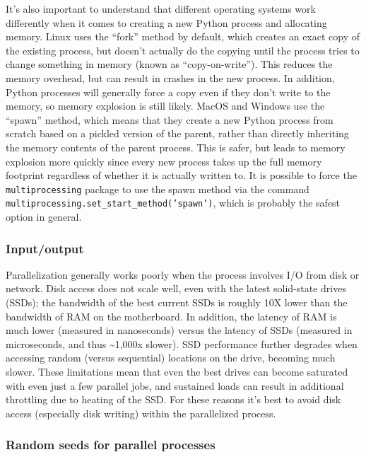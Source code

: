 It's also important to understand that different operating systems work differently when it comes to creating a new Python process and allocating memory.  Linux uses the ``fork'' method by default, which creates an exact copy of the existing process, but doesn't actually do the copying until the process tries to change something in memory (known as ``copy-on-write'').  This reduces the memory overhead, but can result in crashes in the new process. In addition, Python processes will generally force a copy even if they don't write to the memory, so memory explosion is still likely.  MacOS and Windows use the ``spawn'' method, which means that they create a new Python process from scratch based on a pickled version of the parent, rather than directly inheriting the memory contents of the parent process.  This is safer, but leads to memory explosion more quickly since every new process takes up the full memory footprint regardless of whether it is actually written to.  It is possible to force the \texttt{multiprocessing} package to use the spawn method via the command \texttt{multiprocessing.set\_start\_method('spawn')}, which is probably the safest option in general.

\subsubsection{Input/output}

Parallelization generally works poorly when the process involves I/O from disk or network.  Disk access does not scale well, even with the latest solid-state drives (SSDs); the bandwidth of the best current SSDs is roughly 10X lower than the bandwidth of RAM on the motherboard.  In addition, the latency of RAM is much lower (measured in nanoseconds) versus the latency of SSDs (measured in microseconds, and thus {\textasciitilde}1,000x slower).  SSD performance further degrades when accessing random (versus sequential) locations on the drive, becoming much slower.  These limitations mean that even the best drives can become saturated with even just a few parallel jobs, and sustained loads can result in additional throttling due to heating of the SSD.  For these reasons it's best to avoid disk access (especially disk writing) within the parallelized process.

\subsubsection{Random seeds for parallel processes}


